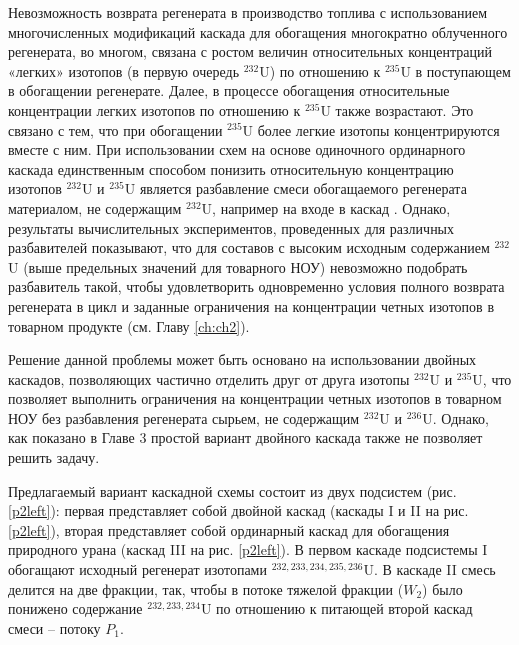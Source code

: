 Невозможность возврата регенерата в производство топлива с использованием многочисленных модификаций каскада для обогащения многократно облученного регенерата, во многом, связана с ростом величин относительных концентраций «легких» изотопов (в первую очередь $^{232}$U) по отношению к $^{235}$U в поступающем в обогащении регенерате. Далее, в процессе обогащения относительные концентрации легких изотопов по отношению к $^{235}$U также возрастают. Это связано с тем, что при обогащении $^{235}$U более легкие изотопы концентрируются вместе с ним. При использовании схем на основе одиночного ординарного каскада единственным способом понизить относительную концентрацию изотопов  $^{232}$U и $^{235}$U является разбавление смеси обогащаемого регенерата материалом, не содержащим $^{232}$U, например на входе в каскад \cite{smirnovKaskadnyeShemyZadachah2012}. Однако, результаты вычислительных экспериментов, проведенных для различных разбавителей показывают, что для составов с высоким исходным содержанием $^{232}$U (выше предельных значений для товарного НОУ) невозможно подобрать разбавитель такой, чтобы удовлетворить одновременно условия полного возврата регенерата в цикл и заданные ограничения на концентрации четных изотопов в товарном продукте (см. Главу \ref{ch:ch2}). 

Решение данной проблемы может быть основано на использовании двойных каскадов, позволяющих частично отделить друг от друга изотопы $^{232}$U и $^{235}$U, что позволяет выполнить ограничения на концентрации четных изотопов в товарном НОУ без разбавления регенерата сырьем, не содержащим $^{232}$U и $^{236}$U. Однако, как показано в Главе 3 простой вариант двойного каскада также не позволяет решить задачу. 

Предлагаемый вариант каскадной схемы состоит из двух подсистем (рис. \ref{p2left}): первая представляет собой двойной каскад (каскады I и II на рис. \ref{p2left}), вторая представляет собой ординарный каскад для обогащения природного урана (каскад III на рис. \ref{p2left}). В первом каскаде подсистемы I обогащают исходный регенерат изотопами $^{232,233,234,235,236}$U. В каскаде II смесь делится на две фракции, так, чтобы в потоке тяжелой фракции ($W_2$) было понижено содержание $^{232,233,234}$U по отношению к питающей второй каскад смеси -- потоку $P_1$. 

